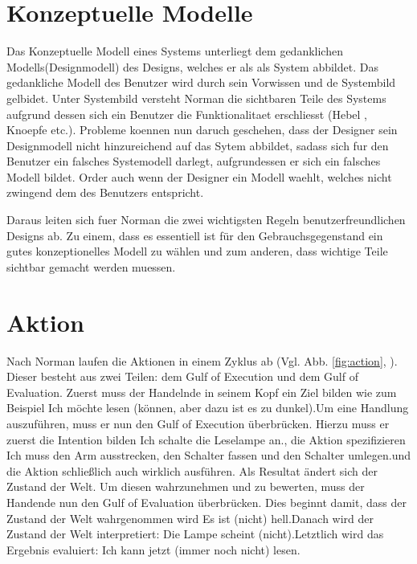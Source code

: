 \documentclass[parskip,headsepline, headtopline, %
footsepline, oneside, 12pt, headings=small]{scrreprt}
\begin{document}
\section{Konzeptuelle Modelle}

Das Konzeptuelle Modell eines Systems unterliegt dem gedanklichen Modells(Designmodell) des Designs, welches er als als System abbildet. Das gedankliche Modell des Benutzer wird durch sein Vorwissen und de Systembild gelbidet. Unter Systembild versteht Norman die sichtbaren Teile des Systems aufgrund dessen sich ein Benutzer die Funktionalitaet erschliesst (Hebel , Knoepfe etc.). Probleme koennen nun daruch geschehen, dass der Designer sein Designmodell nicht hinzureichend auf das Sytem abbildet, sadass sich fur den Benutzer ein falsches Systemodell darlegt, aufgrundessen er sich ein falsches Modell bildet. Order auch wenn der Designer ein Modell waehlt, welches nicht zwingend dem des Benutzers entspricht.

Daraus leiten sich fuer Norman die  zwei wichtigsten Regeln benutzerfreundlichen Designs ab. Zu einem, dass es essentiell ist für den Gebrauchsgegenstand ein gutes konzeptionelles
Modell zu wählen und zum anderen, dass wichtige Teile sichtbar gemacht werden muessen.
\section{Aktion}

Nach Norman laufen die Aktionen in einem Zyklus ab (Vgl. Abb. \ref{fig:action}, \cite[S. 46ff]{don}). Dieser besteht aus zwei Teilen: dem Gulf of Execution und dem Gulf of Evaluation. Zuerst muss der Handelnde in seinem Kopf ein Ziel bilden wie zum Beispiel \glqq Ich möchte lesen (können, aber dazu ist es zu dunkel).\grqq Um eine Handlung auszuführen, muss er nun den Gulf of Execution überbrücken. Hierzu muss er zuerst die Intention bilden \glqq Ich schalte die Leselampe an.\grqq, die Aktion spezifizieren \glqq Ich muss den Arm ausstrecken, den Schalter fassen und den Schalter umlegen.\grqq und die Aktion schließlich auch wirklich ausführen. Als Resultat ändert sich der Zustand der Welt. Um diesen wahrzunehmen und zu bewerten, muss der Handende nun den Gulf of Evaluation überbrücken. Dies beginnt damit, dass der Zustand der Welt wahrgenommen wird \glqq Es ist (nicht) hell.\grqq Danach wird der Zustand der Welt interpretiert: \glqq Die Lampe scheint (nicht).\grqq Letztlich wird das Ergebnis evaluiert: \glqq Ich kann jetzt (immer noch nicht) lesen.\grqq
\end{document}
